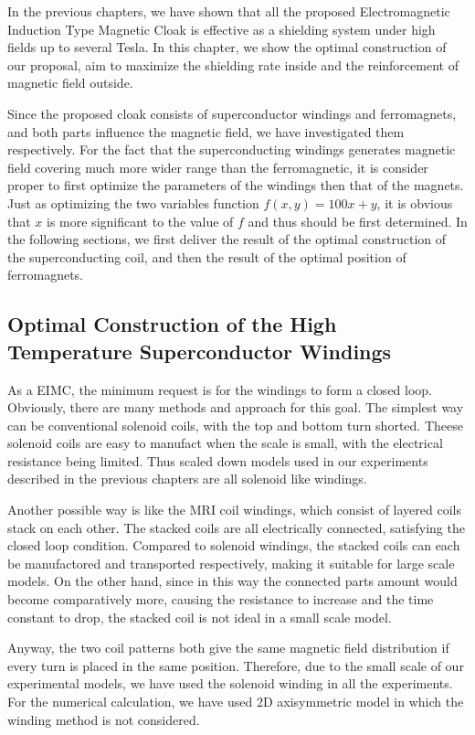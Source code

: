 In the previous chapters, we have shown that all the proposed Electromagnetic Induction Type Magnetic Cloak is effective as a shielding system under high fields up to several Tesla.
In this chapter, we show the optimal construction of our proposal, aim to maximize the shielding rate inside and the reinforcement of magnetic field outside.

Since the proposed cloak consists of superconductor windings and ferromagnets,
and both parts influence the magnetic field,
we have investigated them respectively.
For the fact that the superconducting windings generates magnetic field covering much more wider range than the ferromagnetic,
it is consider proper to first optimize the parameters of the windings then that of the magnets.
Just as optimizing the two variables function $f(x, y) = 100x + y$,
it is obvious that $x$ is more significant to the value of $f$ and thus should be first determined.
In the following sections, we first deliver the result of the optimal construction of the superconducting coil,
and then the result of the optimal position of ferromagnets.


\newpage
\subsection{Optimal Construction of the High Temperature Superconductor Windings}
As a EIMC, the minimum request is for the windings to form a closed loop.
Obviously, there are many methods and approach for this goal.
The simplest way can be conventional solenoid coils, with the top and bottom turn shorted.
Theese solenoid coils are easy to manufact when the scale is small,
with the electrical resistance being limited.
Thus scaled down models used in our experiments described in the previous chapters are all solenoid like windings.

Another possible way is like the MRI coil windings, which consist of layered coils stack on each other.
The stacked coils are all electrically connected, satisfying the closed loop condition.
Compared to solenoid windings, the stacked coils can each be manufactored and transported respectively,
making it suitable for large scale models.
On the other hand, since in this way the connected parts amount would become comparatively more,
causing the resistance to increase and the time constant to drop,
the stacked coil is not ideal in a small scale model.

Anyway, the two coil patterns both give the same magnetic field distribution if every turn is placed in the same position.
Therefore, due to the small scale of our experimental models,
we have used the solenoid winding in all the experiments.
For the numerical calculation, we have used 2D axisymmetric model in which the winding method is not considered.

